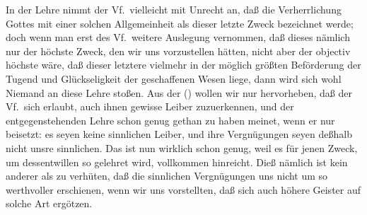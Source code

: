 In der Lehre  nimmt der Vf.\ vielleicht mit Unrecht an, daß die Verherrlichung Gottes mit einer solchen Allgemeinheit als dieser letzte Zweck bezeichnet werde; doch wenn man erst des Vf.\ weitere Auslegung vernommen, daß dieses nämlich nur der höchste Zweck, den wir uns vorzustellen hätten, nicht aber der objectiv höchste wäre, daß dieser letztere vielmehr in der möglich größten Beförderung der Tugend und Glückseligkeit der geschaffenen Wesen liege, dann wird sich wohl Niemand an diese Lehre stoßen. Aus der  () wollen wir nur hervorheben, daß der Vf.\ sich erlaubt,  auch ihnen gewisse Leiber zuzuerkennen, und der entgegenstehenden Lehre schon genug gethan zu haben meinet, wenn er nur beisetzt: es seyen keine sinnlichen Leiber, und ihre Vergnügungen seyen deßhalb nicht unsre sinnlichen. Das ist nun wirklich schon genug, weil es für jenen Zweck, um dessentwillen so gelehret wird, vollkommen hinreicht. Dieß nämlich ist kein anderer als zu verhüten, daß die sinnlichen Vergnügungen uns nicht um so werthvoller erschienen, wenn wir uns vorstellten, daß sich auch höhere Geister auf solche Art ergötzen. \par
\gliederungslinie\par

